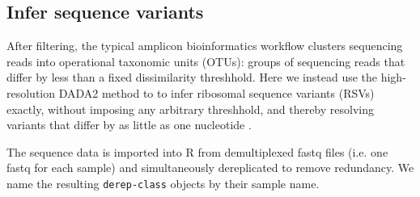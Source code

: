 \begin{knitrout}
\color{fgcolor}\begin{kframe}
\begin{alltt}
\hlstd{(}\hlopt{!}\hlstd{(} 
 \hlkwb{<-}  
 \hlkwb{<-}  
  
  \hlstd{(}
                    \hlstd{=}\hlstd{,} \hlstd{=}\hlstd{(}\hlstd{,} \hlstd{),}
                    \hlstd{=}\hlstd{,} \hlstd{=}\hlstd{,} \hlstd{=}\hlstd{,}
                    \hlstd{=}\hlstd{)}
\hlstd{\}}
\end{alltt}
\end{kframe}
\end{knitrout}

\subsection*{Infer sequence variants}
After filtering, the typical amplicon bioinformatics workflow clusters
sequencing reads into operational taxonomic units (OTUs): groups of
sequencing reads that differ by less than a fixed dissimilarity
threshhold. Here we instead use the high-resolution DADA2
method to to infer ribosomal sequence variants (RSVs) exactly, without imposing
any arbitrary threshhold, and thereby
resolving variants that differ by as little as one nucleotide \cite{dada2}.

The sequence data is imported into R from demultiplexed fastq files (i.e. one
fastq for each sample) and simultaneously dereplicated to remove redundancy. We
name the resulting {\tt derep-class} objects by their sample name.

\begin{knitrout}
\color{fgcolor}\begin{kframe}
\begin{alltt}
 \hlkwb{<-} 
 \hlkwb{<-} 
 \hlkwb{<-} \hlstd{(}\hlstd{(} \hlstd{), `[`,} \hlstd{)}
 \hlkwb{<-} 
 \hlkwb{<-} 
\end{alltt}
\end{kframe}
\end{knitrout}

